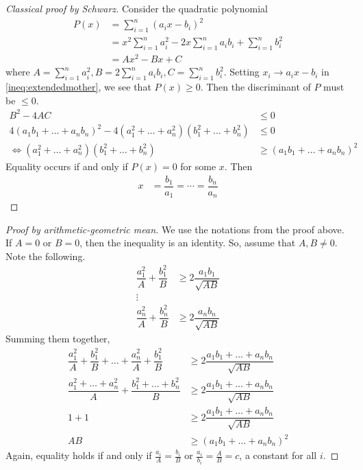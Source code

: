 \documentclass{subfile}
\begin{document}
		\begin{proof}[Classical proof by Schwarz]
			Consider the quadratic polynomial
				\begin{align*}
					P(x)
						& = \sum_{i=1}^n(a_ix-b_i)^2\\
						& = x^2\sum_{i=1}^na_i^2-2x\sum_{i=1}^na_ib_i+\sum_{i=1}^nb_i^2\\
						& = Ax^2-Bx+C
				\end{align*}
			where $A=\sum_{i=1}^na_i^2,B=2\sum_{i=1}^na_ib_i,C=\sum_{i=1}^nb_i^2$. Setting $x_i\to a_ix-b_i$ in \ref{ineq:extendedmother}, we see that $P(x)\geq0$. Then the discriminant of $P$ must be $\leq0$.
				\begin{align*}
					B^2-4AC
						& \leq0\\
					4(a_1b_1+\ldots+a_nb_n)^2-4(a_1^2+\ldots+a_n^2)(b_1^2+\ldots+b_n^2)
						& \leq0\\
					\iff (a_1^2+\ldots+a_n^2)(b_1^2+\ldots+b_n^2)
						& \geq(a_1b_1+\ldots+a_nb_n)^2
				\end{align*}
			Equality occurs if and only if $P(x)=0$ for some $x$. Then
				\begin{align*}
					x
						& = \dfrac{b_1}{a_1}=\cdots=\dfrac{b_n}{a_n}
				\end{align*}
		\end{proof}
	
		\begin{proof}[Proof by arithmetic-geometric mean]
			We use the notations from the proof above. If $A=0$ or $B=0$, then the inequality is an identity. So, assume that $A,B\neq0$. Note the following.
				\begin{align*}
					\dfrac{a_1^2}{A}+\dfrac{b_1^2}{B}
						& \geq2\dfrac{a_1b_1}{\sqrt{AB}}\\
					\vdots\\
					\dfrac{a_n^2}{A}+\dfrac{b_n^2}{B}
						& \geq2\dfrac{a_nb_n}{\sqrt{AB}}
				\end{align*}
			Summing them together,
				\begin{align*}
					\dfrac{a_1^2}{A}+\dfrac{b_1^2}{B}+\ldots+\dfrac{a_n^2}{A}+\dfrac{b_1^2}{B}
						& \geq2\dfrac{a_1b_1+\ldots+a_nb_n}{\sqrt{AB}}\\
					\dfrac{a_1^2+\ldots+a_n^2}{A}+\dfrac{b_1^2+\ldots+b_n^2}{B}
						& \geq2\dfrac{a_1b_1+\ldots+a_nb_n}{\sqrt{AB}}\\
					1+1
						& \geq2\dfrac{a_1b_1+\ldots+a_nb_n}{\sqrt{AB}}\\
					AB
						& \geq\left(a_1b_1+\ldots+a_nb_n\right)^2
				\end{align*}
			Again, equality holds if and only if $\frac{a_i}{A}=\frac{b_i}{B}$ or $\frac{a_i}{b_i}=\frac{A}{B}=c$, a constant for all $i$.
		\end{proof}
	
\end{document}
